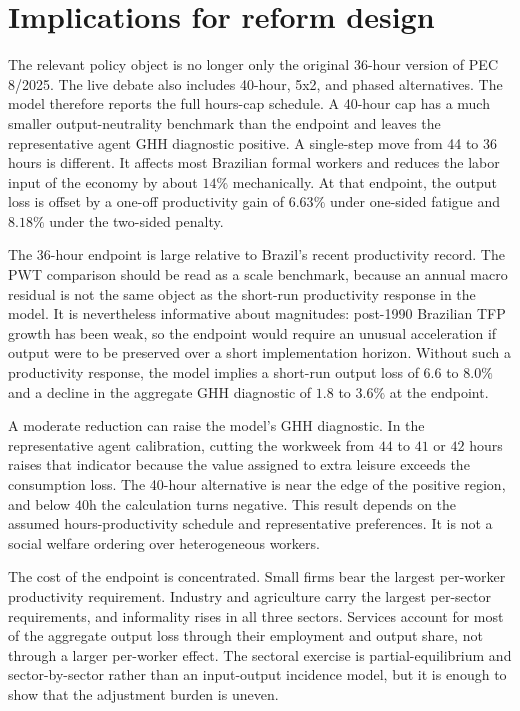 
\section{Implications for reform design}\label{sec:conclusion}

The relevant policy object is no longer only the original 36-hour version of PEC 8/2025. The live debate also includes 40-hour, 5x2, and phased alternatives. The model therefore reports the full hours-cap schedule. A 40-hour cap has a much smaller output-neutrality benchmark than the endpoint and leaves the representative agent GHH diagnostic positive. A single-step move from 44 to 36 hours is different. It affects most Brazilian formal workers and reduces the labor input of the economy by about $14\%$ mechanically. At that endpoint, the output loss is offset by a one-off productivity gain of $6.63\%$ under one-sided fatigue and $8.18\%$ under the two-sided penalty.

The 36-hour endpoint is large relative to Brazil's recent productivity record. The PWT comparison should be read as a scale benchmark, because an annual macro residual is not the same object as the short-run productivity response in the model. It is nevertheless informative about magnitudes: post-1990 Brazilian TFP growth has been weak, so the endpoint would require an unusual acceleration if output were to be preserved over a short implementation horizon. Without such a productivity response, the model implies a short-run output loss of $6.6$ to $8.0\%$ and a decline in the aggregate GHH diagnostic of $1.8$ to $3.6\%$ at the endpoint.

A moderate reduction can raise the model's GHH diagnostic. In the representative agent calibration, cutting the workweek from $44$ to $41$ or $42$ hours raises that indicator because the value assigned to extra leisure exceeds the consumption loss. The 40-hour alternative is near the edge of the positive region, and below $40$h the calculation turns negative. This result depends on the assumed hours-productivity schedule and representative preferences. It is not a social welfare ordering over heterogeneous workers.

The cost of the endpoint is concentrated. Small firms bear the largest per-worker productivity requirement. Industry and agriculture carry the largest per-sector requirements, and informality rises in all three sectors. Services account for most of the aggregate output loss through their employment and output share, not through a larger per-worker effect. The sectoral exercise is partial-equilibrium and sector-by-sector rather than an input-output incidence model, but it is enough to show that the adjustment burden is uneven.

